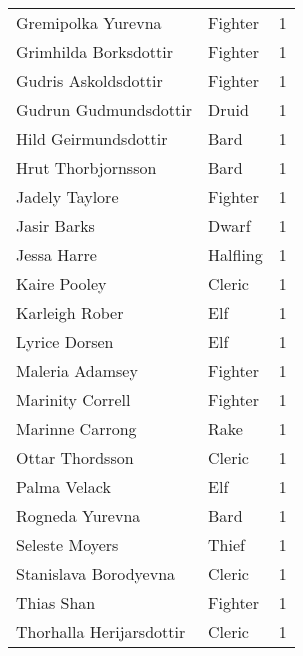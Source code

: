 \begin{tcolorbox}[breakable, title=Index by level]
\begin{supertabular}{p{0.6\columnwidth}lr}
Gremipolka Yurevna                                 & Fighter         &     1\\
Grimhilda Borksdottir                              & Fighter         &     1\\
Gudris Askoldsdottir                               & Fighter         &     1\\
Gudrun Gudmundsdottir                              & Druid           &     1\\
Hild Geirmundsdottir                               & Bard            &     1\\
Hrut Thorbjornsson                                 & Bard            &     1\\
Jadely Taylore                                     & Fighter         &     1\\
Jasir Barks                                        & Dwarf           &     1\\
Jessa Harre                                        & Halfling        &     1\\
Kaire Pooley                                       & Cleric          &     1\\
Karleigh Rober                                     & Elf             &     1\\
Lyrice Dorsen                                      & Elf             &     1\\
Maleria Adamsey                                    & Fighter         &     1\\
Marinity Correll                                   & Fighter         &     1\\
Marinne Carrong                                    & Rake            &     1\\
Ottar Thordsson                                    & Cleric          &     1\\
Palma Velack                                       & Elf             &     1\\
Rogneda Yurevna                                    & Bard            &     1\\
Seleste Moyers                                     & Thief           &     1\\
Stanislava Borodyevna                              & Cleric          &     1\\
Thias Shan                                         & Fighter         &     1\\
Thorhalla Herijarsdottir                           & Cleric          &     1\\

\end{supertabular}
\end{tcolorbox}
